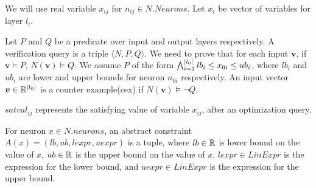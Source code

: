 
We will use real variable $x_{ij}$ for $n_{ij} \in N.Neurons$.
Let $x_i$ be vector of variables for layer $l_i$.

Let $P$ and $Q$ be a predicate over input and output layers respectively.
A verification query is a triple $\langle N, P, Q \rangle$.
We need to prove that for each input $\boldsymbol{v}$,
if $\boldsymbol{v} \models P$, $N(\boldsymbol{v}) \models Q$.
We assume $P$ of the form
$\bigwedge_{i=1}^{|l_0|}lb_i \leq x_{0i} \leq ub_i$, where $lb_i$ and $ub_i$ are lower and upper bounds for neuron $n_{0i}$ respectively.
An input vector $\boldsymbol{v} \in \mathbb{R}^{|l_0|}$ is a counter example(cex) if $N(\boldsymbol{v}) \models \lnot Q$.  



$satval_{ij}$ represents the satisfying value of variable $x_{ij}$, after an optimization query.






\begin{df}
  For neuron $x \in N.neurons$,
  an abstract constraint $A(x) = (lb,ub, lexpr, uexpr)$ is a tuple, where
  $lb \in \mathbb{R}$ is lower bound on the value of $x$,
  $ub \in \mathbb{R}$ is the upper bound on the value of  $x$,
  $lexpr \in LinExpr$ is the expression for the lower bound, and
  $uexpr \in LinExpr$ is the expression for the upper bound.
\end{df}

